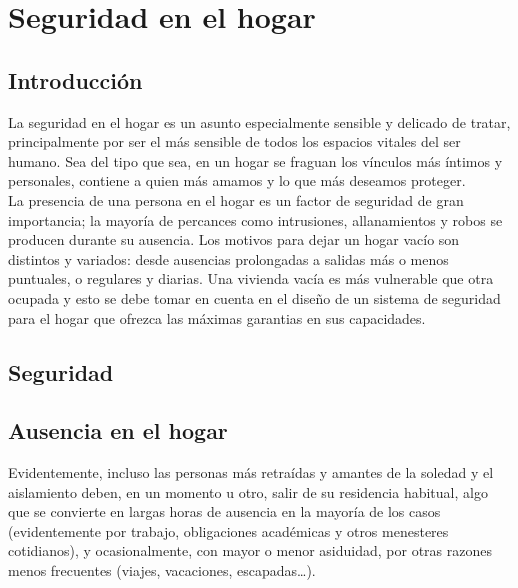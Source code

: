 \chapter{Seguridad en el hogar}



\section{Introducción}
La seguridad en el hogar es un asunto especialmente sensible y delicado de tratar, principalmente por ser el más sensible de todos los espacios vitales del ser humano. Sea del tipo que sea, en un hogar se fraguan los vínculos más íntimos y personales, contiene a quien más amamos y lo que más deseamos proteger.\\

La presencia de una persona en el hogar es un factor de seguridad de gran importancia; la mayoría de percances como intrusiones, allanamientos y robos se producen durante su ausencia. Los motivos para dejar un hogar vacío son distintos y variados: desde ausencias prolongadas a salidas más o menos puntuales, o regulares y diarias. Una vivienda vacía es más vulnerable que otra ocupada y esto se debe tomar en cuenta en el diseño de un sistema de seguridad para el hogar que ofrezca las máximas garantias en sus capacidades.\\

\section{Seguridad}

\section{Ausencia en el hogar}
Evidentemente, incluso las personas más retraídas y amantes de la soledad y el aislamiento deben, en un momento u otro, salir de su residencia habitual, algo que se convierte en largas horas de ausencia en la mayoría de los casos (evidentemente por trabajo, obligaciones académicas y otros menesteres cotidianos), y ocasionalmente, con mayor o menor asiduidad, por otras razones menos frecuentes (viajes, vacaciones, escapadas…).\\
 
